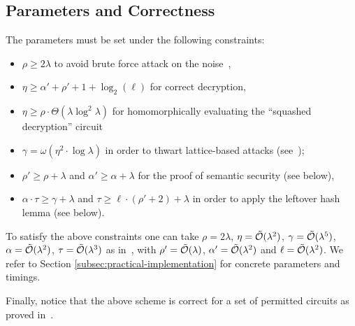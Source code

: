 \documentclass[11pt]{llncs}
\renewcommand\geq\geqslant
\newcommand{\Ot}[1]{{\cal \tilde O}(#1)}
\newcommand\ignore[1]{}
\begin{document}
\subsection{Parameters and Correctness}

\label{s:constraints}

 The parameters must be
set under the following constraints:
\begin{itemize}
\renewcommand{\labelitemi}{\tiny $\bullet$}
\itemsep.4em
\item $\rho \geq 2\lambda$ to avoid brute force attack on the noise~\cite{CN2012},

\item $\eta \geq \alpha'+\rho'+1+\log_2(\ell)$ for correct decryption,

\item  $\eta\geq \rho \cdot \Theta(\lambda\log^2\lambda)$ for
  homomorphically evaluating the ``squashed decryption'' circuit

\item $\gamma = \omega(\eta^2\cdot \log\lambda)$ in order to thwart
  lattice-based attacks (see~\cite{vDGHV2010,CMNT2011});

\item $\rho' \geq \rho + \lambda$ and  $\alpha' \geq \alpha+\lambda$  for
  the proof of semantic security (see below),

\item $\alpha\cdot \tau\geq \gamma+\lambda$ and $\tau \geq \ell \cdot
  (\rho'+2) + \lambda$ in order to apply the
  leftover hash lemma (see below).
\end{itemize}

To satisfy the above constraints one can take $\rho=2\lambda$,
$\eta=\Ot{\lambda^2}$, $\gamma=\Ot{\lambda^5}$,
$\alpha=\Ot{\lambda^2}$, $\tau=\Ot{\lambda^3}$ as in~\cite{CNT2012},
with $\rho'=\Ot{\lambda}$, $\alpha'=\Ot{\lambda^2}$ and $\ell=\Ot{\lambda^2}$.\ignore{ 
The main difference with the original DGHV scheme is that the
ciphertext expansion ratio becomes $\gamma/\ell=\Ot{\lambda^3}$
instead of $\gamma=\Ot{\lambda^5}$. However the public key size (using
the compressed public key technique from~\cite{CNT2012}) becomes 
$\Ot{\lambda^7}$ instead of $\Ot{\lambda^5}$.}
We refer to Section 
\ref{subsec:practical-implementation} for concrete parameters and
timings.

Finally, notice that the above scheme is correct for a set of permitted circuits as proved in~\cite[Appendix~A]{CLT2013a}.
\end{document}
